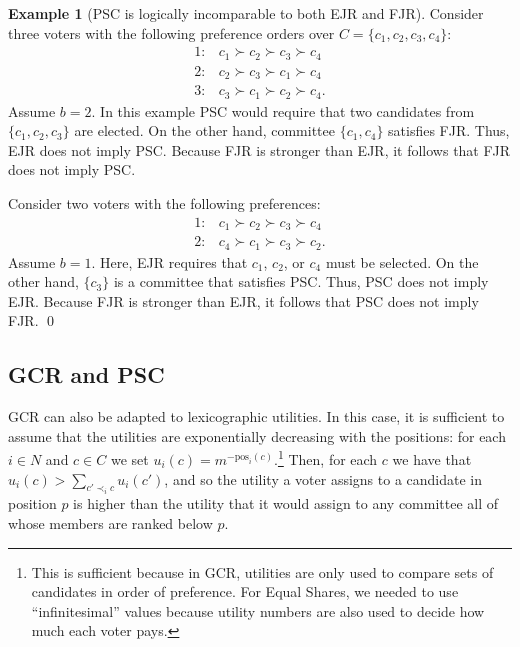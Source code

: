 \documentclass[10pt]{scrartcl}
\theoremstyle{definition}
\newtheorem{example}{Example}
\theoremstyle{plain}
\newcommand{\pos}{{{{\mathrm{pos}}}}}
\begin{document}
\begin{example}[PSC is logically incomparable to both EJR and FJR]\label{ex:ejr_and_psc}
	Consider three voters with the following preference orders over $C = \{c_1, c_2, c_3, c_4\}$:
	\begin{align*}
		1\colon & c_1 \succ c_2 \succ c_3 \succ c_4 \\
		2\colon & c_2 \succ c_3 \succ c_1 \succ c_4 \\
		3\colon & c_3 \succ c_1 \succ c_2 \succ c_4 \text{.}
	\end{align*}
	Assume $b = 2$. In this example PSC would require that two candidates from $\{c_1, c_2, c_3\}$ are elected. On the other hand, committee $\{c_1, c_4\}$ satisfies FJR. Thus, EJR does not imply PSC. Because FJR is stronger than EJR, it follows that FJR does not imply PSC.
	
	Consider two voters with the following preferences:
	\begin{align*}
		1\colon & c_1 \succ c_2 \succ c_3 \succ c_4 \\
		2\colon & c_4 \succ c_1 \succ c_3 \succ c_2 \text{.}
	\end{align*}
	Assume $b=1$. Here, EJR requires that $c_1$, $c_2$, or $c_4$ must be selected. On the other hand, $\{c_3\}$ is a committee that satisfies PSC. Thus, PSC does not imply EJR. Because FJR is stronger than EJR, it follows that PSC does not imply FJR.
	\qed
\end{example}

\subsection{GCR and PSC}

GCR can also be adapted to lexicographic utilities. In this case, it is sufficient to assume that the utilities are exponentially decreasing with the positions: for each $i \in N$ and $c \in C$ we set $u_i(c) = m^{-\pos_i(c)}$.\footnote{This is sufficient because in GCR, utilities are only used to compare sets of candidates in order of preference. For Equal Shares, we needed to use ``infinitesimal'' values because utility numbers are also used to decide how much each voter pays.} Then, for each $c$ we have that $u_i(c) > \sum_{c' \prec_i c} u_i(c')$, and so the utility a voter assigns to a candidate in position $p$ is higher than the utility that it would assign to any committee all of whose members are ranked below $p$. 
\end{document}
